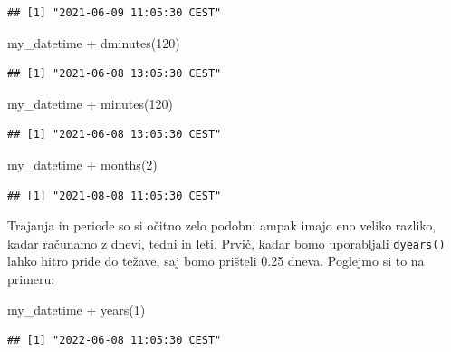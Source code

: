 \documentclass[
]{book}
\newenvironment{Shaded}{\begin{snugshade}}{\end{snugshade}}
\newcommand{\DecValTok}[1]{\textcolor[rgb]{0.00,0.00,0.81}{#1}}
\newcommand{\FunctionTok}[1]{\textcolor[rgb]{0.00,0.00,0.00}{#1}}
\newcommand{\NormalTok}[1]{#1}
\newcommand{\SpecialCharTok}[1]{\textcolor[rgb]{0.00,0.00,0.00}{#1}}
\begin{document}
\begin{verbatim}
## [1] "2021-06-09 11:05:30 CEST"
\end{verbatim}

\begin{Shaded}
\begin{Highlighting}[]
\NormalTok{my\_datetime }\SpecialCharTok{+} \FunctionTok{dminutes}\NormalTok{(}\DecValTok{120}\NormalTok{)}
\end{Highlighting}
\end{Shaded}

\begin{verbatim}
## [1] "2021-06-08 13:05:30 CEST"
\end{verbatim}

\begin{Shaded}
\begin{Highlighting}[]
\NormalTok{my\_datetime }\SpecialCharTok{+} \FunctionTok{minutes}\NormalTok{(}\DecValTok{120}\NormalTok{)}
\end{Highlighting}
\end{Shaded}

\begin{verbatim}
## [1] "2021-06-08 13:05:30 CEST"
\end{verbatim}

\begin{Shaded}
\begin{Highlighting}[]
\NormalTok{my\_datetime }\SpecialCharTok{+} \FunctionTok{months}\NormalTok{(}\DecValTok{2}\NormalTok{)}
\end{Highlighting}
\end{Shaded}

\begin{verbatim}
## [1] "2021-08-08 11:05:30 CEST"
\end{verbatim}

Trajanja in periode so si očitno zelo podobni ampak imajo eno veliko razliko, kadar računamo z dnevi, tedni in leti. Prvič, kadar bomo uporabljali \texttt{dyears()} lahko hitro pride do težave, saj bomo prišteli 0.25 dneva. Poglejmo si to na primeru:

\begin{Shaded}
\begin{Highlighting}[]
\NormalTok{my\_datetime }\SpecialCharTok{+} \FunctionTok{years}\NormalTok{(}\DecValTok{1}\NormalTok{)}
\end{Highlighting}
\end{Shaded}

\begin{verbatim}
## [1] "2022-06-08 11:05:30 CEST"
\end{verbatim}
\end{document}
